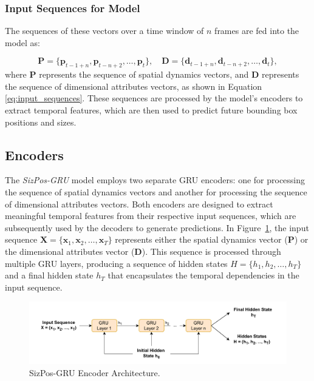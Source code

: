 \documentclass[12pt,oneside]{book} %
\begin{document}
\subsubsection*{Input Sequences for Model}
\noindent The sequences of these vectors over a time window of \(n\) frames are fed into the model as:

\[
    \mathbf{P} = \{\mathbf{p}_{t-1+n}, \mathbf{p}_{t-n+2}, \dots, \mathbf{p}_t\}, \quad \mathbf{D} = \{\mathbf{d}_{t-1+n}, \mathbf{d}_{t-n+2}, \dots, \mathbf{d}_t\}, \label{eq:input_sequences}
\]
where $\mathbf{P}$ represents the sequence of spatial dynamics vectors, and
$\mathbf{D}$ represents the sequence of dimensional attributes vectors, as
shown in Equation \eqref{eq:input_sequences}. These sequences are processed by
the model's encoders to extract temporal features, which are then used to
predict future bounding box positions and sizes.

\subsection{Encoders}
\noindent The \textit{SizPos-GRU} model employs two separate GRU encoders: one for processing the sequence of spatial dynamics vectors and another for processing the sequence of dimensional attributes vectors. Both encoders are designed to extract meaningful temporal features from their respective input sequences, which are subsequently used by the decoders to generate predictions. In Figure~\ref{fig:sizpos-gru-encoder}, the input sequence \( \mathbf{X} = \{\mathbf{x}_1, \mathbf{x}_2, \dots, \mathbf{x}_T\} \) represents either the spatial dynamics vector (\(\mathbf{P}\)) or the dimensional attributes vector (\(\mathbf{D}\)). This sequence is processed through multiple GRU layers, producing a sequence of hidden states \( H = \{h_1, h_2, \dots, h_T\} \) and a final hidden state \( h_T \) that encapsulates the temporal dependencies in the input sequence.

\begin{figure}[H]
    \centering
    \includegraphics[width=1\textwidth]{figures/GRUSizPosEncoder.drawio.pdf}
    \caption{SizPos-GRU Encoder Architecture.}
    \label{fig:sizpos-gru-encoder}
\end{figure}
\end{document}
